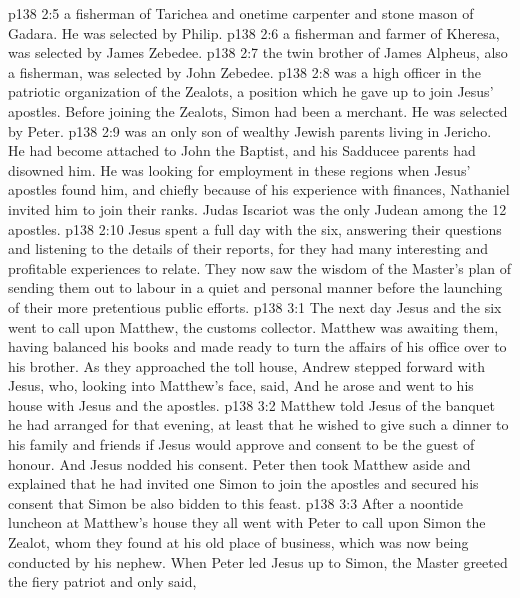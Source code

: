 \vs p138 2:5 \bibnobreakspace {} a fisherman of Tarichea and onetime carpenter and stone mason of Gadara. He was selected by Philip.
\vs p138 2:6 \bibnobreakspace {} a fisherman and farmer of Kheresa, was selected by James Zebedee.
\vs p138 2:7 \bibnobreakspace {} the twin brother of James Alpheus, also a fisherman, was selected by John Zebedee.
\vs p138 2:8 \bibnobreakspace {} was a high officer in the patriotic organization of the Zealots, a position which he gave up to join Jesus’ apostles. Before joining the Zealots, Simon had been a merchant. He was selected by Peter.
\vs p138 2:9 \bibnobreakspace {} was an only son of wealthy Jewish parents living in Jericho. He had become attached to John the Baptist, and his Sadducee parents had disowned him. He was looking for employment in these regions when Jesus’ apostles found him, and chiefly because of his experience with finances, Nathaniel invited him to join their ranks. Judas Iscariot was the only Judean among the 12 apostles.
\vs p138 2:10 \pc Jesus spent a full day with the six, answering their questions and listening to the details of their reports, for they had many interesting and profitable experiences to relate. They now saw the wisdom of the Master’s plan of sending them out to labour in a quiet and personal manner before the launching of their more pretentious public efforts.
\vs p138 3:1 The next day Jesus and the six went to call upon Matthew, the customs collector. Matthew was awaiting them, having balanced his books and made ready to turn the affairs of his office over to his brother. As they approached the toll house, Andrew stepped forward with Jesus, who, looking into Matthew’s face, said,  And he arose and went to his house with Jesus and the apostles.
\vs p138 3:2 Matthew told Jesus of the banquet he had arranged for that evening, at least that he wished to give such a dinner to his family and friends if Jesus would approve and consent to be the guest of honour. And Jesus nodded his consent. Peter then took Matthew aside and explained that he had invited one Simon to join the apostles and secured his consent that Simon be also bidden to this feast.
\vs p138 3:3 \pc After a noontide luncheon at Matthew’s house they all went with Peter to call upon Simon the Zealot, whom they found at his old place of business, which was now being conducted by his nephew. When Peter led Jesus up to Simon, the Master greeted the fiery patriot and only said, 
